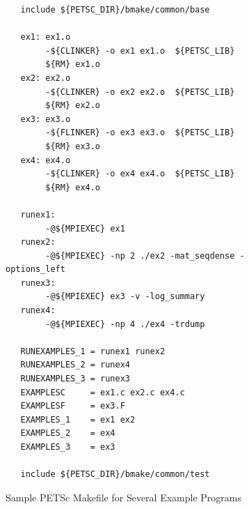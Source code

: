 {{{\begin{figure}[H]
{\begin{verbatim}
   include ${PETSC_DIR}/bmake/common/base

   ex1: ex1.o 
        -${CLINKER} -o ex1 ex1.o  ${PETSC_LIB}
        ${RM} ex1.o
   ex2: ex2.o 
        -${CLINKER} -o ex2 ex2.o  ${PETSC_LIB}
        ${RM} ex2.o
   ex3: ex3.o 
        -${FLINKER} -o ex3 ex3.o  ${PETSC_LIB}
        ${RM} ex3.o
   ex4: ex4.o 
        -${CLINKER} -o ex4 ex4.o  ${PETSC_LIB}
        ${RM} ex4.o

   runex1:
        -@${MPIEXEC} ex1
   runex2:
        -@${MPIEXEC} -np 2 ./ex2 -mat_seqdense -options_left
   runex3:
        -@${MPIEXEC} ex3 -v -log_summary
   runex4:
        -@${MPIEXEC} -np 4 ./ex4 -trdump

   RUNEXAMPLES_1 = runex1 runex2
   RUNEXAMPLES_2 = runex4
   RUNEXAMPLES_3 = runex3
   EXAMPLESC     = ex1.c ex2.c ex4.c
   EXAMPLESF     = ex3.F
   EXAMPLES_1    = ex1 ex2
   EXAMPLES_2    = ex4
   EXAMPLES_3    = ex3

   include ${PETSC_DIR}/bmake/common/test
\end{verbatim}
}
\caption{Sample PETSc Makefile for Several Example Programs}
\label{fig_make2}
\end{figure}

}}}
